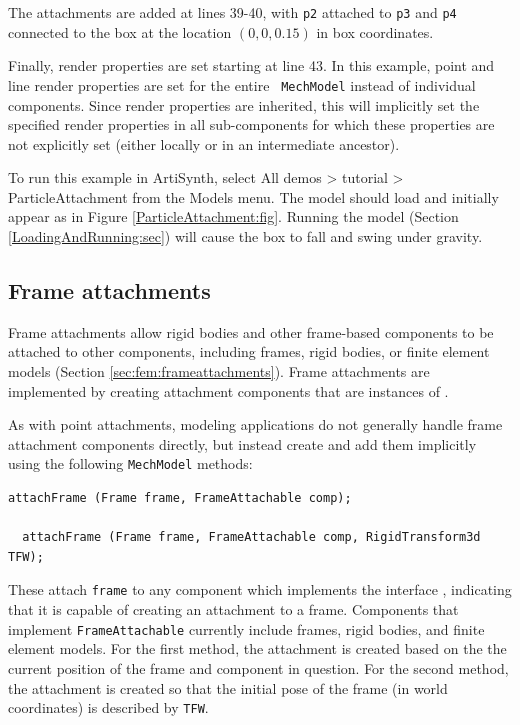 The attachments are added at lines 39-40, with {\tt p2} attached to
{\tt p3} and {\tt p4} connected to the box at the location $(0, 0,
0.15)$ in box coordinates. 

Finally, render properties are set starting at line 43. In this
example, point and line render properties are set for the entire {\tt
MechModel} instead of individual components.  Since render properties
are inherited, this will implicitly set the specified render
properties in all sub-components for which these properties are not
explicitly set (either locally or in an intermediate ancestor).

To run this example in ArtiSynth, select {\sf All demos > tutorial >
ParticleAttachment} from the {\sf Models} menu. The model should load
and initially appear as in Figure \ref{ParticleAttachment:fig}.
Running the model (Section \ref{LoadingAndRunning:sec}) will cause the
box to fall and swing under gravity.

\subsection{Frame attachments}
\label{sec:mech:frameattachments}

Frame attachments allow rigid bodies and other frame-based components to
be attached to other components, including frames, rigid
bodies, or finite element models (Section \ref{sec:fem:frameattachments}).
Frame attachments are implemented by creating attachment components that are
instances of .

As with point attachments, modeling applications do not generally
handle frame attachment components directly, but instead create and
add them
implicitly using the following {\tt MechModel} methods:
%
\begin{lstlisting}[]
  attachFrame (Frame frame, FrameAttachable comp);

  attachFrame (Frame frame, FrameAttachable comp, RigidTransform3d TFW);
\end{lstlisting}
%
These attach {\tt frame} to any component which implements the
interface ,
indicating that it is capable of creating an attachment to a
frame. Components that implement {\tt FrameAttachable} currently
include frames, rigid bodies, and finite element models.  For the
first method, the attachment is created based on the the current
position of the frame and component in question. For the second
method, the attachment is created so that the initial pose of the frame
(in world coordinates) is described by {\tt TFW}.

